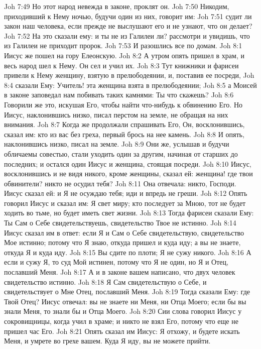 \vs Joh 7:49 Но этот народ невежда в законе, проклят он.
\vs Joh 7:50 Никодим, приходивший к Нему ночью, будучи один из них, говорит им:
\vs Joh 7:51 судит ли закон наш человека, если прежде не выслушают его и не узнают, что он делает?
\vs Joh 7:52 На это сказали ему: и ты не из Галилеи ли? рассмотри и увидишь, что из Галилеи не приходит пророк.
\vs Joh 7:53 И разошлись все по домам.
\vs Joh 8:1 Иисус же пошел на гору Елеонскую.
\vs Joh 8:2 А утром опять пришел в храм, и весь народ шел к Нему. Он сел и учил их.
\vs Joh 8:3 Тут книжники и фарисеи привели к Нему женщину, взятую в прелюбодеянии, и, поставив ее посреди,
\vs Joh 8:4 сказали Ему: Учитель! эта женщина взята в прелюбодеянии;
\vs Joh 8:5 а Моисей в законе заповедал нам побивать таких камнями: Ты что скажешь?
\vs Joh 8:6 Говорили же это, искушая Его, чтобы найти что-нибудь к обвинению Его. Но Иисус, наклонившись низко, писал перстом на земле, не обращая на них внимания.
\vs Joh 8:7 Когда же продолжали спрашивать Его, Он, восклонившись, сказал им: кто из вас без греха, первый брось на нее камень.
\vs Joh 8:8 И опять, наклонившись низко, писал на земле.
\vs Joh 8:9 Они же, услышав  и будучи обличаемы совестью, стали уходить один за другим, начиная от старших до последних; и остался один Иисус и женщина, стоящая посреди.
\vs Joh 8:10 Иисус, восклонившись и не видя никого, кроме женщины, сказал ей: женщина! где твои обвинители? никто не осудил тебя?
\vs Joh 8:11 Она отвечала: никто, Господи. Иисус сказал ей: и Я не осуждаю тебя; иди и впредь не греши.
\rsbpar\vs Joh 8:12 Опять говорил Иисус  и сказал им: Я свет миру; кто последует за Мною, тот не будет ходить во тьме, но будет иметь свет жизни.
\vs Joh 8:13 Тогда фарисеи сказали Ему: Ты Сам о Себе свидетельствуешь, свидетельство Твое не истинно.
\vs Joh 8:14 Иисус сказал им в ответ: если Я и Сам о Себе свидетельствую, свидетельство Мое истинно; потому что Я знаю, откуда пришел и куда иду; а вы не знаете, откуда Я и куда иду.
\vs Joh 8:15 Вы сдите по плоти; Я не сужу никого.
\vs Joh 8:16 А если и сужу Я, то суд Мой истинен, потому что Я не один, но Я и Отец, пославший Меня.
\vs Joh 8:17 А и в законе вашем написано, что двух человек свидетельство истинно.
\vs Joh 8:18 Я Сам свидетельствую о Себе, и свидетельствует о Мне Отец, пославший Меня.
\vs Joh 8:19 Тогда сказали Ему: где Твой Отец? Иисус отвечал: вы не знаете ни Меня, ни Отца Моего; если бы вы знали Меня, то знали бы и Отца Моего.
\vs Joh 8:20 Сии слова говорил Иисус у сокровищницы, когда учил в храме; и никто не взял Его, потому что еще не пришел час Его.
\vs Joh 8:21 Опять сказал им Иисус: Я отхожу, и будете искать Меня, и умрете во грехе вашем. Куда Я иду,  вы не можете прийти.
